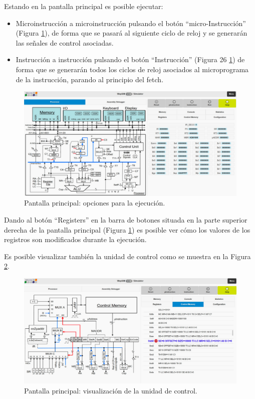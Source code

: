Estando en la pantalla principal es posible ejecutar:

\begin{itemize}

\item Microinstrucción a microinstrucción pulsando el botón ``micro-Instrucción'' (Figura \ref{fig:anexob-9}), de forma que se pasará al siguiente ciclo de reloj y se generarán las señales de control asociadas.

\item Instrucción a instrucción pulsando el botón ``Instrucción'' (Figura 26 \ref{fig:anexob-9}) de forma que se generarán todos los ciclos de reloj asociados al microprograma de la instrucción, parando al principio del fetch.

\end{itemize}

\begin{figure}[htbp]
 	\centering
 	\includegraphics[width=15cm]{figures/anexob-9}
 	\caption{Pantalla principal: opciones para la ejecución.}
	\label{fig:anexob-9}
\end{figure}

Dando al botón ``Registers'' en la barra de botones situada en la parte superior derecha de la pantalla principal (Figura \ref{fig:anexob-9}) es posible ver cómo los valores de los registros son modificados durante la ejecución.

Es posible visualizar también la unidad de control como se muestra en la Figura \ref{fig:anexob-10}.

\begin{figure}[htbp]
 	\centering
 	\includegraphics[width=15cm]{figures/anexob-10}
 	\caption{Pantalla principal: visualización de la unidad de control.}
	\label{fig:anexob-10}
\end{figure}

